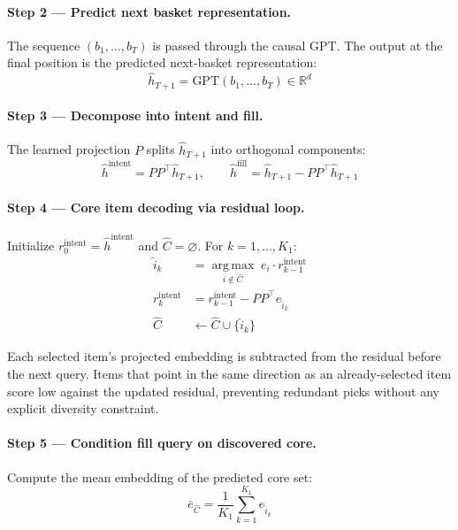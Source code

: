 \documentclass[conference]{IEEEtran}
\begin{document}
\paragraph{Step 2 --- Predict next basket representation.}
The sequence $(b_1, \ldots, b_T)$ is passed through the causal GPT.
The output at the final position is the predicted next-basket
representation:
\begin{equation}
\hat{h}_{T+1} = \text{GPT}(b_1, \ldots, b_T) \in \mathbb{R}^d
\end{equation}

\paragraph{Step 3 --- Decompose into intent and fill.}
The learned projection $P$ splits $\hat{h}_{T+1}$ into orthogonal
components:
\begin{equation}
\hat{h}^{\text{intent}} = PP^\top \hat{h}_{T+1}, \qquad
\hat{h}^{\text{fill}}   = \hat{h}_{T+1} - PP^\top \hat{h}_{T+1}
\end{equation}

\paragraph{Step 4 --- Core item decoding via residual loop.}
Initialize $r_0^{\text{intent}} = \hat{h}^{\text{intent}}$ and
$\hat{C} = \varnothing$. For $k = 1, \ldots, K_1$:
\begin{align}
\hat{i}_k &= \operatorname*{arg\,max}_{i \notin \hat{C}}\;
             e_i \cdot r_{k-1}^{\text{intent}} \\
r_k^{\text{intent}} &= r_{k-1}^{\text{intent}} - PP^\top e_{\hat{i}_k} \\
\hat{C} &\leftarrow \hat{C} \cup \{\hat{i}_k\}
\end{align}

Each selected item's projected embedding is subtracted from the
residual before the next query. Items that point in the same direction
as an already-selected item score low against the updated residual,
preventing redundant picks without any explicit diversity constraint.

\paragraph{Step 5 --- Condition fill query on discovered core.}
Compute the mean embedding of the predicted core set:
\begin{equation}
\bar{e}_{\hat{C}} = \frac{1}{K_1} \sum_{k=1}^{K_1} e_{\hat{i}_k}
\end{equation}
\end{document}
